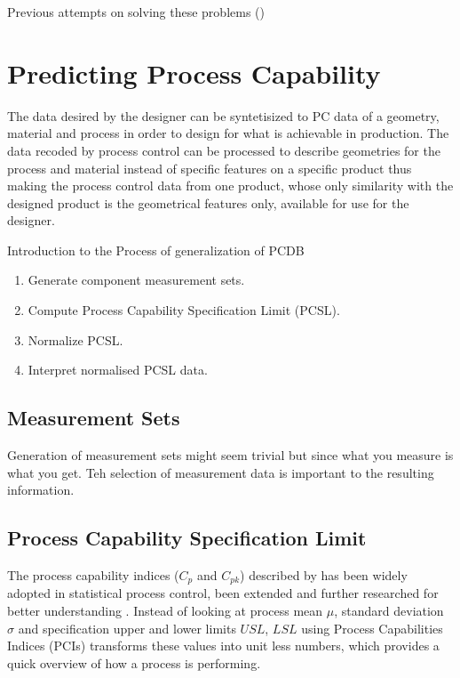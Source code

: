 \documentclass[aip,amsmath, reprint, author-year]{revtex4-1}
\begin{document}
Previous attempts on solving these problems 
(\cite{kern2003forecasting, thornton2004variation})

\section{Predicting Process Capability}

The data desired by the designer can be syntetisized to PC data of a geometry, material and process in order to design for what is achievable in production. 
The data recoded by process control can be processed to describe geometries for the process and material instead of specific features on a specific product thus making the process control data from one product, whose only similarity with the designed product is the geometrical features only, available for use for the designer.

Introduction to the Process of generalization of PCDB

\begin{enumerate}
 	\item Generate component measurement sets. 
	\item Compute Process Capability Specification Limit (PCSL).
	\item Normalize PCSL.
	\item Interpret normalised PCSL data.
\end{enumerate}

\subsection{Measurement Sets}

Generation of measurement sets might seem trivial but since what you measure is what you get. Teh selection of measurement data is important to the resulting information.

\subsection{Process Capability Specification Limit}
The process capability indices ($C_p$ and $C_{pk}$) described by \cite{kane1986process} has been widely adopted in statistical process control, been extended and further researched for better understanding \citep{wu2009overview}. 
Instead of looking at process mean $\mu$, standard deviation $\sigma$ and specification upper and lower limits $USL$, $LSL$ using Process Capabilities Indices (PCIs) transforms these values into unit less numbers, which provides a quick overview of how a process is performing.
\end{document}
